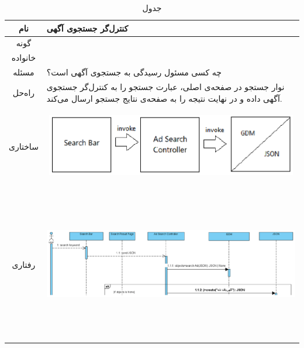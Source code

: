 \begin{table}[H]
	\begin{adjustbox}{width=\textwidth}
		\begin{tabular}{|c|p{\textwidth}|}
			\hline
			نام &
			کنترل‌گر جستجوی آگهی \\ 
			\hline
			گونه & 
			\grasp \\
			\hline
			خانواده &
			\controller \\
			\hline
			مسئله & 
			چه کسی مسئول رسیدگی به جستجوی آگهی است؟\\
			\hline
			راه‌حل& 
نوار جستجو در صفحه‌ی اصلی، عبارت جستجو را به کنترل‌گر جستجوی آگهی داده و در نهایت نتیجه را به صفحه‌ی نتایج جستجو ارسال می‌کند. \\
			\hline
			ساختاری & 
			\begin{minipage}{\textwidth}
				\begin{flushleft}
					\begin{minipage}{\textwidth}
						\includegraphics[width=13cm, height=2.7cm]{./images/7-2-1}
					\end{minipage}
				\end{flushleft}
			\end{minipage}
			
			\\
			\hline
			رفتاری & 
			\begin{minipage}{\textwidth}
				\begin{flushleft}
					\begin{minipage}{\textwidth}
						\includegraphics[width=13.5cm, height=6cm]{./images/7-2-2}
					\end{minipage}
				\end{flushleft}
			\end{minipage}
			\\
			\hline
		\end{tabular}
	\end{adjustbox}
	\caption{جدول }
	\label{table-with-pic:2}
\end{table}

